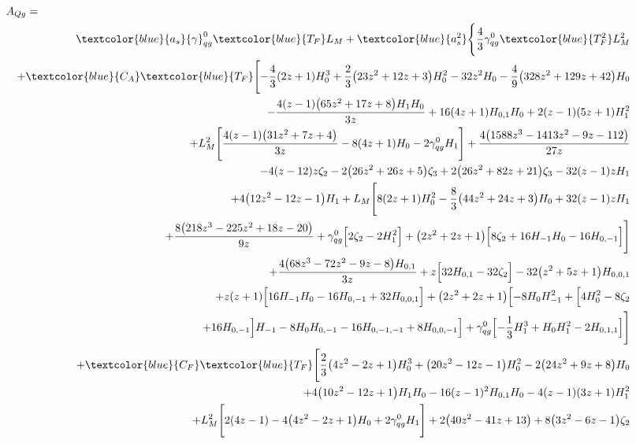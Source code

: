 \begin{eqnarray}
\lefteqn{A_{Qg} = } &&
\nonumber \\ &&
\textcolor{blue}{a_s} {\gamma}_{qg}^{0} \textcolor{blue}{T_F} L_M 
+ \textcolor{blue}{a_s^2}
\Biggl\{
\frac{4}{3} {\gamma}_{qg}^{0} \textcolor{blue}{T_F^2} L_M^2
\nonumber \\ &&
+\textcolor{blue}{C_A} \textcolor{blue}{T_F} \Biggl[-\frac{4}{3} (2 z+1) H_0^3+\frac{2}{3} \big(23 z^2+12 z+3\big)H_0^2-32  z^2 H_0-\frac{4}{9} \big(328 z^2+129 z+42\big) H_0
\nonumber \\ &&
-\frac{4 (z-1) \big(65 z^2+17 z+8\big) H_1 H_0}{3 z}+16 (4 z+1) H_{0,1} H_0+2(z-1) (5 z+1) H_1^2
\nonumber \\ &&
+L_M^2 \Biggl[\frac{4 (z-1) \big(31 z^2+7 z+4\big)}{3 z}-8 (4 z+1) H_0-2{\gamma}_{qg}^{0} H_1\Biggr]
+\frac{4 \big(1588 z^3-1413 z^2-9 z-112\big)}{27 z}
\nonumber \\ &&
-4 (z-12) z \zeta_2-2 \big(26 z^2+26 z+5\big) \zeta_3
+2 \big(26 z^2+82 z+21\big) \zeta_3-32  (z-1) z H_1
\nonumber \\ &&
+4 \big(12z^2-12 z-1\big) H_1
+L_M \Biggl[8 (2 z+1) H_0^2-\frac{8}{3} \big(44z^2+24 z+3\big) H_0
+32 (z-1) z H_1
\nonumber \\ &&
+\frac{8 \big(218 z^3-225 z^2+18 z-20\big)}{9 z}
+{\gamma}_{qg}^{0} \Bigl[2 \zeta_2-2 H_1^2\Bigr]+\big(2 z^2+2z+1\big) \Bigl[8  \zeta_2+16  H_{-1} H_0-16 H_{0,-1}\Bigr]\Biggr]
\nonumber \\ &&
+\frac{4 \big(68 z^3-72 z^2-9 z-8\big) H_{0,1}}{3 z}+z \Bigl[32 H_{0,1}-32  \zeta_2\Bigr]
-32 \big(z^2+5 z+1\big) H_{0,0,1}
\nonumber \\ &&
+z (z+1) \Bigl[16 H_{-1} H_0 -16 H_{0,-1} +32  H_{0,0,1}\Bigr]
+\big(2 z^2+2 z+1\big) \Bigl[-8 H_0 H_{-1}^2+\Bigl[4 H_0^2-8 \zeta_2
\nonumber \\ &&
+16 H_{0,-1}\Bigr] H_{-1}-8 H_0 H_{0,-1}-16 H_{0,-1,-1}+8 H_{0,0,-1}
\Bigr]+{\gamma}_{qg}^{0}\Bigl[-\frac{1}{3} H_1^3+H_0 H_1^2-2 H_{0,1,1}\Bigr]\Biggr]
\nonumber \\ &&
%
+\textcolor{blue}{C_F} \textcolor{blue}{T_F} 
\Biggl[
\frac{2}{3} \big(4 z^2-2 z+1\big) H_0^3
+\big(20 z^2-12 z-1\big)H_0^2-2 \big(24 z^2+9 z+8\big) H_0
\nonumber \\ &&
+4 \big(10 z^2-12 z+1\big) H_1 H_0
-16 (z-1)^2 H_{0,1} H_0-4 (z-1) (3 z+1) H_1^2
\nonumber \\ &&
+ L_M^2 \Biggl[2 (4 z-1)-4 \big(4 z^2-2z+1\big) H_0+2 {\gamma}_{qg}^{0} H_1\Biggr]
+2 \big(40 z^2-41 z+13\big)+8 \big(3 z^2-6 z-1\big) \zeta_2
\nonumber \\ &&

\end{eqnarray}
